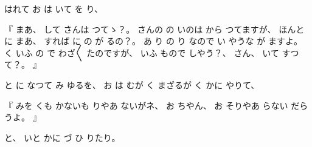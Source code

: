 %
はれて
お
は
いて
を
り、

%
『
まあ、
%
して
さんは
つてゝ？。
%
さんの
%
の
いのは
から
つてますが、
%
ほんとに
まあ、
%
すれば
に%
の
が
るの？。
%
あ
り
の
り
なので
い
やうな
が
ますよ。
%
く
いふ
の
で
わざ〳〵
たのですが、
いふ
もので
しやう？、
%
さん、
%
いて
すつて？。
』

%
と
に
なつて
み
ゆるを、
%
お
は
むが
く
まざるが
く
かに
やりて、

%
『
みを
くも
かないも
りやあ
ないがネ、
%
お
ちやん、
%
お
そりやあ
らない
だらうよ。
』

%
と、
%
いと
かに
づ
ひ
りたり。
